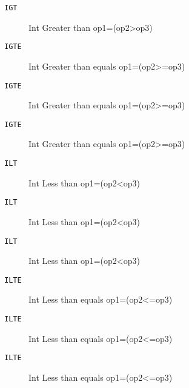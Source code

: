 \begin{description}
\item[\texttt{IGT}]  Int Greater than op1=(op2>op3)\\

\end{description}
\begin{description}
\item[\texttt{IGTE}]  Int Greater than equals op1=(op2>=op3)\\

\end{description}
\begin{description}
\item[\texttt{IGTE}]  Int Greater than equals op1=(op2>=op3)\\

\end{description}
\begin{description}
\item[\texttt{IGTE}]  Int Greater than equals op1=(op2>=op3)\\

\end{description}
\begin{description}
\item[\texttt{ILT}]  Int Less than op1=(op2<op3)\\

\end{description}
\begin{description}
\item[\texttt{ILT}]  Int Less than op1=(op2<op3)\\

\end{description}
\begin{description}
\item[\texttt{ILT}]  Int Less than op1=(op2<op3)\\

\end{description}
\begin{description}
\item[\texttt{ILTE}]  Int Less than equals op1=(op2<=op3)\\

\end{description}
\begin{description}
\item[\texttt{ILTE}]  Int Less than equals op1=(op2<=op3)\\

\end{description}
\begin{description}
\item[\texttt{ILTE}]  Int Less than equals op1=(op2<=op3)\\

\end{description}
